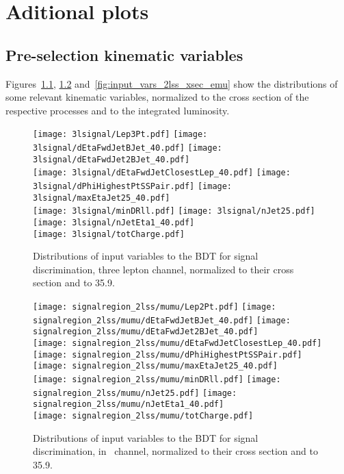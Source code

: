 \chapter{Aditional plots}


\section{Pre-selection kinematic variables} \label{app:presel_plots}

Figures~\ref{fig:input_vars_3l_xsec}, \ref{fig:input_vars_2lss_xsec_mumu} and~\ref{fig:input_vars_2lss_xsec_emu} show the distributions of some relevant kinematic variables, normalized to the cross section of the respective processes and to the integrated luminosity.
\newpage
\begin{figure} [!h]
  \centering
  \texttt{[image: 3lsignal/Lep3Pt.pdf]}
  \texttt{[image: 3lsignal/dEtaFwdJetBJet\_40.pdf]}
  \texttt{[image: 3lsignal/dEtaFwdJet2BJet\_40.pdf]}\\
  \texttt{[image: 3lsignal/dEtaFwdJetClosestLep\_40.pdf]} 
  \texttt{[image: 3lsignal/dPhiHighestPtSSPair.pdf]}
  \texttt{[image: 3lsignal/maxEtaJet25\_40.pdf]}\\
  \texttt{[image: 3lsignal/minDRll.pdf]}
  \texttt{[image: 3lsignal/nJet25.pdf]} 
  \texttt{[image: 3lsignal/nJetEta1\_40.pdf]}\\
  \texttt{[image: 3lsignal/totCharge.pdf]}
  \caption{Distributions of input variables to the BDT for signal discrimination, three lepton channel, normalized to their cross section and to 35.9\fbinv.}
  \label{fig:input_vars_3l_xsec}
\end{figure}

\begin{figure} [!h]
  \centering
  \texttt{[image: signalregion\_2lss/mumu/Lep2Pt.pdf]}
  \texttt{[image: signalregion\_2lss/mumu/dEtaFwdJetBJet\_40.pdf]}
  \texttt{[image: signalregion\_2lss/mumu/dEtaFwdJet2BJet\_40.pdf]}\\
  \texttt{[image: signalregion\_2lss/mumu/dEtaFwdJetClosestLep\_40.pdf]}
  \texttt{[image: signalregion\_2lss/mumu/dPhiHighestPtSSPair.pdf]}
  \texttt{[image: signalregion\_2lss/mumu/maxEtaJet25\_40.pdf]}\\
  \texttt{[image: signalregion\_2lss/mumu/minDRll.pdf]}
  \texttt{[image: signalregion\_2lss/mumu/nJet25.pdf]} 
  \texttt{[image: signalregion\_2lss/mumu/nJetEta1\_40.pdf]}\\
  \texttt{[image: signalregion\_2lss/mumu/totCharge.pdf]}
  \caption{Distributions of input variables to the BDT for signal discrimination, in \mumu\ channel, normalized to their cross section and to 35.9\fbinv.}
  \label{fig:input_vars_2lss_xsec_mumu}
\end{figure}

